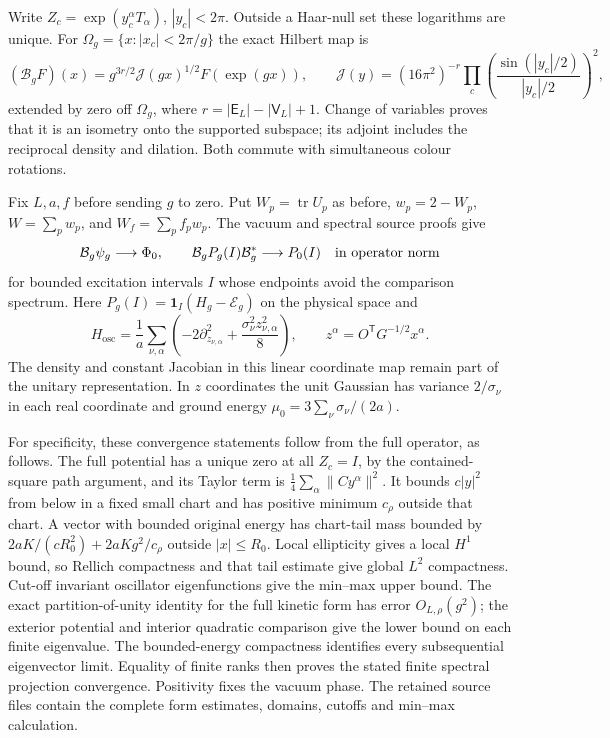 \documentclass[11pt]{article}
\begin{document}
Write $Z_c=\exp(y_c^\alpha T_\alpha)$, $|y_c|<2\pi$.
Outside a Haar-null set these logarithms are unique. For
$\Omega_g=\{x:|x_c|<2\pi/g\}$ the exact Hilbert map is
\begin{equation}\label{eq:low-chart}
 (\mathcal B_gF)(x)=
 g^{3r/2}\mathcal J(gx)^{1/2}F(\exp(gx)),\qquad
 \mathcal J(y)=(16\pi^2)^{-r}
 \prod_c\left(\frac{\sin(|y_c|/2)}{|y_c|/2}\right)^2,
\end{equation}
extended by zero off $\Omega_g$, where $r=|\mathsf E_L|-|\mathsf V_L|+1$.
Change of variables proves that it is an isometry onto the supported
subspace; its adjoint includes the reciprocal density and dilation.
Both commute with simultaneous colour rotations.

Fix $L,a,f$ before sending $g$ to zero. Put $W_p= \operatorname{tr}U_p$
as before, $w_p=2-W_p$, $W=\sum_pw_p$, and $W_f=\sum_pf_pw_p$.
The vacuum and spectral source proofs give
\[
 \mathcal B_g\psi_g\longrightarrow\Phi_0,\qquad
 \mathcal B_gP_g(I)\mathcal B_g^*\longrightarrow P_0(I)
 \quad\hbox{in operator norm}
\]
for bounded excitation intervals $I$ whose endpoints avoid the comparison
spectrum. Here $P_g(I)=\mathbf1_I(H_g-\mathcal E_g)$ on the physical
space and
\[
 H_{\mathrm{osc}}=\frac1a\sum_{\nu,\alpha}
 \left(-2\partial_{z_{\nu,\alpha}}^2+
             \frac{\sigma_\nu^2z_{\nu,\alpha}^2}{8}\right),
 \qquad z^\alpha=O^{\mathsf T}G^{-1/2}x^\alpha .
\]
The density and constant Jacobian in this linear coordinate map remain
part of the unitary representation. In $z$ coordinates the unit
Gaussian has variance $2/\sigma_\nu$ in each real coordinate and
ground energy $\mu_0=3\sum_\nu\sigma_\nu/(2a)$.

For specificity, these convergence statements follow from the full
operator, as follows. The full potential has a unique zero at all
$Z_c=I$, by the contained-square path argument, and its Taylor term is
$\frac14\sum_\alpha\|Cy^\alpha\|^2$. It bounds $c|y|^2$ from below in a
fixed small chart and has positive minimum $c_\rho$ outside that chart.
A vector with bounded original energy has chart-tail mass bounded by
$2aK/(cR_0^2)+2aKg^2/c_\rho$ outside $|x|\le R_0$.
Local ellipticity gives a local $H^1$ bound, so Rellich compactness
and that tail estimate give global $L^2$ compactness.
Cut-off invariant oscillator eigenfunctions give the min--max upper
bound. The exact partition-of-unity identity for the full kinetic
form has error $O_{L,\rho}(g^2)$; the exterior potential and interior
quadratic comparison give the lower bound on each finite eigenvalue.
The bounded-energy compactness identifies every subsequential
eigenvector limit. Equality of finite ranks then proves the stated
finite spectral projection convergence. Positivity fixes the vacuum
phase. The retained source files contain the complete form estimates,
domains, cutoffs and min--max calculation.
\end{document}
